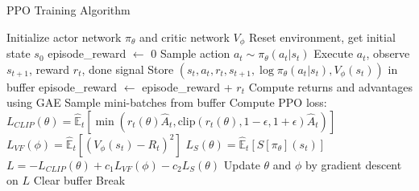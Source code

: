 \documentclass[12pt]{article}
\begin{document}
\begin{algorithm}
\caption{PPO Training Algorithm}
\begin{algorithmic}[1]
\State Initialize actor network $\pi_\theta$ and critic network $V_\phi$
    \State Reset environment, get initial state $s_0$
    \State episode\_reward $\gets$ 0
        \State Sample action $a_t \sim \pi_\theta(a_t|s_t)$
        \State Execute $a_t$, observe $s_{t+1}$, reward $r_t$, done signal
        \State Store $(s_t, a_t, r_t, s_{t+1}, \log\pi_\theta(a_t|s_t), V_\phi(s_t))$ in buffer
        \State episode\_reward $\gets$ episode\_reward + $r_t$
            \State Compute returns and advantages using GAE
                \State Sample mini-batches from buffer
                \State Compute PPO loss:
                \State $L_{CLIP}(\theta) = \hat{\mathbb{E}}_t[\min(r_t(\theta)\hat{A}_t, \text{clip}(r_t(\theta), 1-\epsilon, 1+\epsilon)\hat{A}_t)]$
                \State $L_{VF}(\phi) = \hat{\mathbb{E}}_t[(V_\phi(s_t) - R_t)^2]$
                \State $L_{S}(\theta) = \hat{\mathbb{E}}_t[S[\pi_\theta](s_t)]$
                \State $L = -L_{CLIP}(\theta) + c_1 L_{VF}(\phi) - c_2 L_{S}(\theta)$
                \State Update $\theta$ and $\phi$ by gradient descent on $L$
            \EndFor
            \State Clear buffer
        \EndIf
            \State Break
        \EndIf
    \EndFor
\EndFor
\end{algorithmic}
\end{algorithm}

\end{document}
